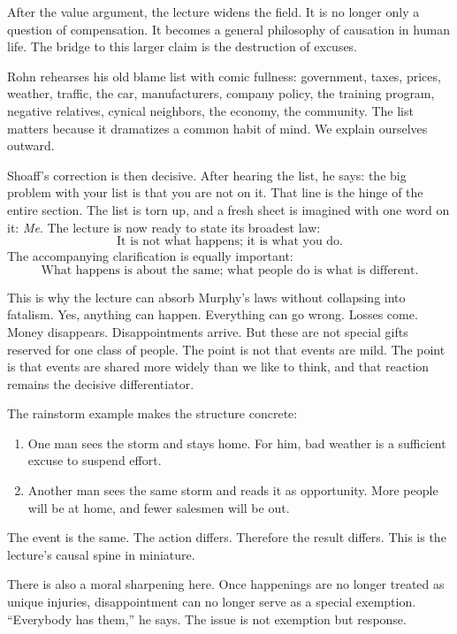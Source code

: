 After the value argument, the lecture widens the field. It is no longer only a question of compensation. It becomes a general philosophy of causation in human life. The bridge to this larger claim is the destruction of excuses.

Rohn rehearses his old blame list with comic fullness: government, taxes, prices, weather, traffic, the car, manufacturers, company policy, the training program, negative relatives, cynical neighbors, the economy, the community. The list matters because it dramatizes a common habit of mind. We explain ourselves outward.

Shoaff's correction is then decisive. After hearing the list, he says: the big problem with your list is that you are not on it. That line is the hinge of the entire section. The list is torn up, and a fresh sheet is imagined with one word on it: \emph{Me}. The lecture is now ready to state its broadest law:
\begin{equation}
\text{It is not what happens; it is what you do.}
\end{equation}
The accompanying clarification is equally important:
\begin{equation}
\text{What happens is about the same; what people do is what is different.}
\end{equation}

This is why the lecture can absorb Murphy's laws without collapsing into fatalism. Yes, anything can happen. Everything can go wrong. Losses come. Money disappears. Disappointments arrive. But these are not special gifts reserved for one class of people. The point is not that events are mild. The point is that events are shared more widely than we like to think, and that reaction remains the decisive differentiator.

The rainstorm example makes the structure concrete:
\begin{enumerate}
\item One man sees the storm and stays home. For him, bad weather is a sufficient excuse to suspend effort.
\item Another man sees the same storm and reads it as opportunity. More people will be at home, and fewer salesmen will be out.
\end{enumerate}
The event is the same. The action differs. Therefore the result differs. This is the lecture's causal spine in miniature.

There is also a moral sharpening here. Once happenings are no longer treated as unique injuries, disappointment can no longer serve as a special exemption. ``Everybody has them,'' he says. The issue is not exemption but response.


